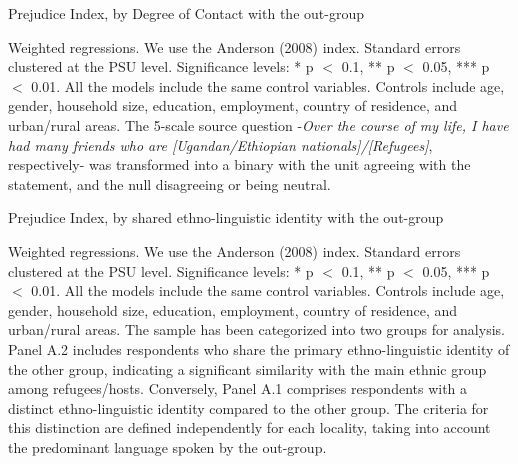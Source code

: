 \documentclass[a4paper,12pt]{article}
\renewcommand{\footnotesize}{\fontsize{8pt}{9pt}\selectfont}
\begin{document}
\begin{appendix}
\begin{table}[H]
	\footnotesize
	\caption{Prejudice Index, by Degree of Contact with the out-group}
	\label{tab:contact}
	\centering
	\begin{threeparttable}
		\centering
		
	\begin{tablenotes}
		\footnotesize
		\item Weighted regressions. We use the Anderson (2008) index. Standard errors clustered at the PSU level. Significance levels: * p $<$ 0.1, ** p $<$ 0.05, *** p $<$ 0.01. All the models include the same control variables. Controls include age, gender, household size, education, employment, country of residence, and urban/rural areas. The 5-scale source question -\textit{Over the course of my life, I have had many friends who are [Ugandan/Ethiopian nationals]/[Refugees]}, respectively- was transformed into a binary with the unit agreeing with the statement, and the null disagreeing or being neutral. 
	\end{tablenotes}
	\end{threeparttable}
\end{table} 
\vspace{8mm}

	\setstretch{1}
\begin{table}[H]
	\footnotesize
	\caption{Prejudice Index, by shared ethno-linguistic identity with the out-group}
	\label{tab:het_ethno}
	\centering
	\begin{threeparttable}
		\centering

		

\begin{tablenotes}
	\footnotesize
	\item Weighted regressions. We use the Anderson (2008) index. Standard errors clustered at the PSU level. Significance levels: * p $<$ 0.1, ** p $<$ 0.05, *** p $<$ 0.01. All the models include the same control variables. Controls include age, gender, household size, education, employment, country of residence, and urban/rural areas. The sample has been categorized into two groups for analysis. Panel A.2 includes respondents who share the primary ethno-linguistic identity of the other group, indicating a significant similarity with the main ethnic group among refugees/hosts. Conversely, Panel A.1 comprises respondents with a distinct ethno-linguistic identity compared to the other group. The criteria for this distinction are defined independently for each locality, taking into account the predominant language spoken by the out-group. 
\end{tablenotes}
\end{threeparttable}
\end{table} 
\vspace{8mm}



\end{appendix}
\end{document}
